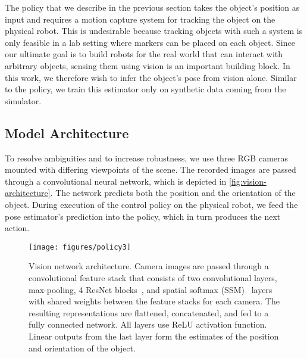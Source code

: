The policy that we describe in the previous section
takes the object's position as input and requires a motion capture system for tracking the object
on the physical robot.
This is undesirable because tracking objects with such a system is only feasible in a lab setting where markers can be placed on each object.
Since our ultimate goal is to build robots for the real world that can interact with arbitrary objects, sensing them using vision is an important building block.
In this work, we therefore wish to infer the object's pose from vision alone.
Similar to the policy, we train this estimator only on synthetic data coming from the simulator. %

\subsection{Model Architecture}
\label{sec:vision_model_arch}

To resolve ambiguities and to increase robustness, we use three RGB cameras mounted with differing viewpoints of the scene.
The recorded images are passed through a convolutional neural network, which is depicted in \autoref{fig:vision-architecture}.
The network predicts both the position and the orientation of the object.
During execution of the control policy on the physical robot, we feed the pose estimator's prediction into the policy,
which in turn produces the next action.

\begin{figure}[h]
    \begin{minipage}[c]{0.45\textwidth}
        \texttt{[image: figures/policy3]}
    \end{minipage}\hfill
    \begin{minipage}[c]{0.55\textwidth}
        \caption{Vision network architecture. Camera images are passed through a convolutional feature stack that consists of two convolutional layers, max-pooling, 4 ResNet blocks~\cite{He2016DeepRL}, and spatial softmax (SSM)~\cite{finn2015deep} layers with shared weights between the feature stacks for each camera.
        The resulting representations are flattened, concatenated, and fed to a fully connected network. %
        All layers use ReLU \cite{relu} activation function.
        Linear outputs from the last layer form the estimates of the position and orientation of the object.
        }
        \label{fig:vision-architecture}
    \end{minipage}\hfill
\end{figure}

